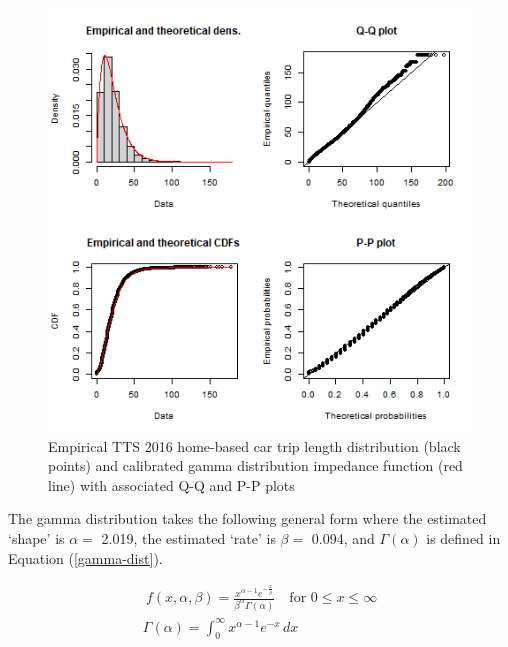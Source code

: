 \documentclass[]{elsarticle} %
\begin{document}
\begin{figure}

{\centering \includegraphics[width=1\linewidth]{images/impedance_function} 

}

\caption{\label{fig:TLD-Gamma-plot}Empirical TTS 2016 home-based car trip length distribution (black points) and calibrated gamma distribution impedance function (red line) with associated Q-Q and P-P plots}\label{fig:TLD-Gamma-plot}
\end{figure}

The gamma distribution takes the following general form where the
estimated `shape' is \(\alpha=\) 2.019, the estimated `rate' is
\(\beta =\) 0.094, and \(\Gamma(\alpha)\) is defined in Equation
(\ref{gamma-dist}).

\begin{equation}
\label{gamma-dist}
\begin{array}{l}\ 
f(x, \alpha, \beta) = \frac {x^{\alpha-1}e^{-\frac{x}{\beta}}}{ \beta^{\alpha}\Gamma(\alpha)} \quad \text{for } 0 \leq x \leq \infty\\

\Gamma(\alpha) =  \int_{0}^{\infty} x^{\alpha-1}e^{-x} \,dx\\
\end{array}
\end{equation}
\end{document}
